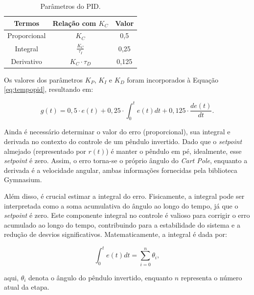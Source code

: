 \documentclass[12pt,           %
a4paper,                       %
openany,                       %
oneside,                       %
chapter=TITLE,                 %
english,                       %
spanish,                       %
brazil,                        %
sumario=tradicional]{abntex2}  %
\begin{document}
\begin{OnehalfSpace}
\begin{table}[H]
	\centering
	\vspace*{-.2cm}
	\caption{Parâmetros do PID.}
        \begin{tabular}{|c|c|c|}
        	\hline
             Termos & Relação com $K_C$ & Valor \\
            \hline
            Proporcional & $K_C$ & 0,5 \\
            \hline
            Integral & $\frac{K_C}{\tau_I}$ & 0,25 \\
            \hline
            Derivativo & $K_C \cdot \tau_D$ & 0,125 \\
            \hline
        \end{tabular}
        \label{tab:parcp}                 %
    \end{table}
\vspace*{-0.65cm}
{\raggedright {}}

Os valores dos parâmetros $K_P$, $K_I$ e $K_D$ foram incorporados à Equação \ref{eq:tempopid}, resultando em:

\begin{equation}
     g(t) = 0,5 \cdot e(t) + 0,25\cdot \int_0^t e(t) dt + 0,125 \cdot \frac{de(t)}{dt}.
    \label{eq:tempopidv}
\end{equation}

Ainda é necessário determinar o valor do erro (proporcional), sua integral e derivada no contexto do controle de um pêndulo invertido. Dado que o \textit{setpoint} almejado (representado por \( r(t) \)) é manter o pêndulo em pé, idealmente, esse \textit{setpoint} é zero. Assim, o erro torna-se o próprio ângulo do \textit{Cart Pole}, enquanto a derivada é a velocidade angular, ambas informações fornecidas pela biblioteca Gymnasium.

Além disso, é crucial estimar a integral do erro. Fisicamente, a integral pode ser interpretada como a soma acumulativa do ângulo ao longo do tempo, já que o \textit{setpoint} é zero. Este componente integral no controle é valioso para corrigir o erro acumulado ao longo do tempo, contribuindo para a estabilidade do sistema e a redução de desvios significativos. Matematicamente, a integral é dada por:

\begin{equation}
    \int_0^t e(t) dt = \sum_{i=0}^n \theta_i,
    \label{eq:integral}
\end{equation}

\noindent aqui, $\theta_i$ denota o ângulo do pêndulo invertido, enquanto $n$ representa o número atual da etapa. 


\end{OnehalfSpace}
\end{document}

